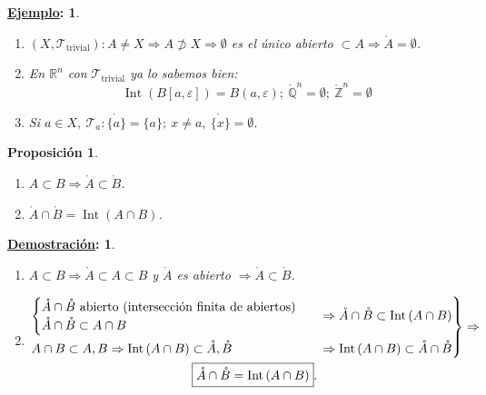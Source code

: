 \documentclass[10pt,a4paper,openright]{book}
\theoremstyle{break}
\newtheorem*{prop}{Proposición}
\newtheorem*{demo}{\underline{Demostración}:}
\newtheorem*{ej}{\underline{Ejemplo}:}
\DeclareMathOperator{\inter}{Int}
\begin{document}
\begin{ej}
\begin{enumerate}
    \item $\left( X, \mathcal{T}_{\text{trivial}} \right): A \neq X \Rightarrow A \not \supset X \Rightarrow \emptyset$ es el único abierto $\subset A \Rightarrow \mathring{A} = \emptyset$.

    \item En $\mathbb{R}^n$ con $\mathcal{T}_{\text{trivial}}$ ya lo sabemos bien:
    \[
    \inter\left( B\left[ a, \varepsilon \right] \right)  = B\left( a, \varepsilon \right);\ \mathring{\mathbb{Q}}^n = \emptyset;\ \mathring{\mathbb{Z}}^n = \emptyset
    \]
    \item Si $a \in X,\ \mathcal{T}_a : \mathring{\{a\}} = \{a\};\ x \neq a,\ \mathring{\{x\}} = \emptyset$.
\end{enumerate}
\end{ej}

\begin{prop}
\begin{enumerate}
    \item $A \subset B \Rightarrow \mathring{A} \subset \mathring{B}$.
    \item $\mathring{A} \cap \mathring{B} = \inter \left( A \cap B \right)$.
\end{enumerate}
\end{prop}
\begin{demo}
\begin{enumerate}
    \item $A \subset B \Rightarrow \mathring{A} \subset A \subset B$ y $\mathring{A}$ es abierto $\Rightarrow \mathring{A} \subset \mathring{B}$.
    \item 
    \begin{gather*}
    \begin{rcases}
    \begin{cases}
        \mathring{A} \cap \mathring{B} \text{ abierto (intersección finita de abiertos)}\\
        \mathring{A} \cap \mathring{B} \subset A \cap B 
    \end{cases} &\Rightarrow \mathring{A} \cap \mathring{B} \subset \inter \left( A \cap B \right)\\
    A \cap B \subset A, B \Rightarrow \inter \left( A \cap B \right) \subset \mathring{A}, \mathring{B} &\Rightarrow \inter\left( A \cap B \right) \subset \mathring{A} \cap \mathring{B}
    \end{rcases} \Rightarrow\\
    \boxed{\mathring{A} \cap \mathring{B} = \inter\left( A \cap B \right)} 
    .\end{gather*}
\end{enumerate}
\end{demo}
\end{document}
